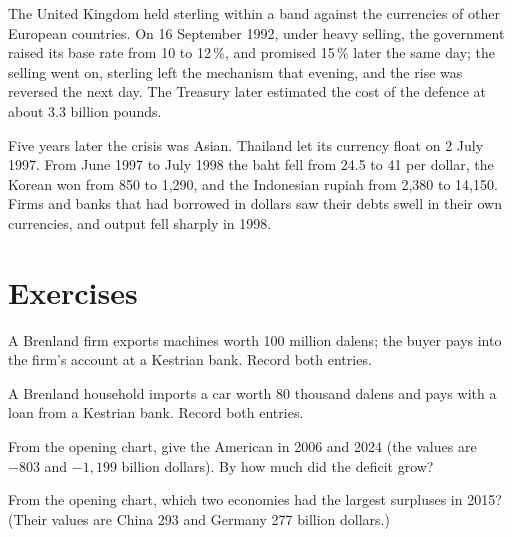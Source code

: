 \begin{record}
The United Kingdom held sterling within a band against the currencies of other European countries. On 16 September 1992, under heavy selling, the government raised its base
rate from 10 to 12\,\%, and promised 15\,\% later the same day; the selling went on, sterling left the mechanism that evening, and the rise was reversed the next day. The
Treasury later estimated the cost of the defence at about 3.3 billion pounds.
\end{record}

Five years later the crisis was Asian. Thailand let its currency float on 2 July 1997. From June 1997 to July 1998 the baht fell from 24.5 to 41 per dollar, the Korean won
from 850 to 1,290, and the Indonesian rupiah from 2,380 to 14,150. Firms and banks that had borrowed in dollars saw their debts swell in their own currencies, and output fell
sharply in 1998.

\section{Exercises}

\begin{exercise}[$\star$]\label{exo:g12:exchange-rates-and-balance-of-payments:1}
A Brenland firm exports machines worth 100 million dalens; the buyer pays into the firm's account at a Kestrian bank. Record both entries.
\end{exercise}

\begin{exercise}[$\star$]\label{exo:g12:exchange-rates-and-balance-of-payments:2}
A Brenland household imports a car worth 80 thousand dalens and pays with a loan from a Kestrian bank. Record both entries.
\end{exercise}

\begin{exercise}[$\star$]\label{exo:g12:exchange-rates-and-balance-of-payments:3}
From the opening chart, give the American  in 2006 and 2024 (the values are $-803$ and $-1{,}199$ billion dollars). By how much did the deficit grow?
\end{exercise}

\begin{exercise}[$\star$]\label{exo:g12:exchange-rates-and-balance-of-payments:4}
From the opening chart, which two economies had the largest surpluses in 2015? (Their values are China 293 and Germany 277 billion dollars.)
\end{exercise}

